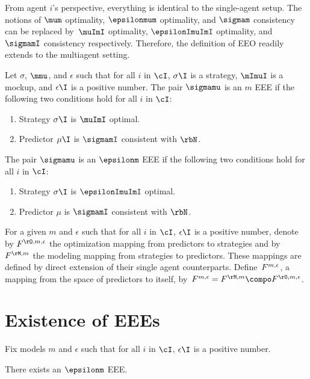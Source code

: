 From agent \(i\)'s perspective, everything is identical to the single-agent setup.
The notions of \(\mum\) optimality, \(\epsilonmum\) optimality, and \(\sigmam\) consistency can be replaced by~\(\muImI\) optimality, \(\epsilonImuImI\) optimality, and \(\sigmamI\) consistency respectively.
Therefore, the definition of EEO readily extends to the multiagent setting.
\begin{definition}
Let \(\sigma\), \(\mmu\), and \(\epsilon\) such that for all \(i\) in \(\cI\), \(\sigma\I\) is a strategy, \(\mImuI\) is a mockup, and \(\epsilon\I\) is a positive number.
The pair \(\sigmamu\) is an \(m\) EEE if the following two conditions hold for all \(i\) in \(\cI\):
\begin{enumerate}
\item Strategy \(\sigma\I\) is \(\muImI\) optimal.
\item Predictor \(\mu\I\) is \(\sigmamI\) consistent with \(\rbN\).
\end{enumerate}
The pair \(\sigmamu\) is an \(\epsilonm\) EEE if the following two conditions hold for all \(i\) in \(\cI\):
\begin{enumerate}
\item Strategy \(\sigma\I\) is \(\epsilonImuImI\) optimal.
\item Predictor \(\mu\) is \(\sigmamI\) consistent with \(\rbN\).
\end{enumerate}
\end{definition}

For a given \(m\) and \(\epsilon\) such that for all \(i\) in \(\cI\), \(\epsilon\I\) is a positive number, denote by \(\FO\) the optimization mapping from predictors to strategies and by \(\FM\) the modeling mapping from strategies to  predictors.
These mappings are defined by direct extension of their single agent counterparts.
Define~\(F^{m, \epsilon}\), a mapping from the space of predictors to itself, by~\(\FF = \FM \compo \FO\).


\section{Existence of EEEs}
\label{sec:existence_of_eees}


Fix models \(m\) and \(\epsilon\) such that for all \(i\) in \(\cI\), \(\epsilon\I\) is a positive number.

\begin{theorem}
\label{res:mme_existence}
There exists an \(\epsilonm\) EEE.
\end{theorem}

